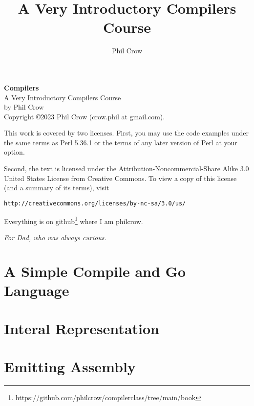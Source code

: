 \documentclass{book}
\begin{document}
\frontmatter
\pagestyle{empty}
\title{A Very Introductory Compilers Course}
\author{Phil Crow}
\date{}
\maketitle

\noindent
\textbf{Compilers} \\
A Very Introductory Compilers Course \\
by Phil Crow \\

\vspace{.2in}
\noindent
Copyright \copyright 2023 Phil Crow (crow.phil at gmail.com).

\noindent
This work is covered by two licenses.  First, you may use the code examples
under the same terms as Perl 5.36.1 or the terms of any later version
of Perl at your option.

Second, the text is licensed under the
Attribution-Noncommercial-Share Alike 3.0 United States License
from Creative Commons.
To view a copy of this license (and a summary of its terms), visit

\begin{verbatim}
http://creativecommons.org/licenses/by-nc-sa/3.0/us/
\end{verbatim}

Everything is on github\footnote{https://github.com/philcrow/compilerclass/tree/main/book} where I am philcrow.

\newpage
\pagestyle{headings}

\begin{center}
\textit{For Dad, who was always curious.}
\end{center}

\tableofcontents



\mainmatter
{}

\part{A Simple Compile and Go Language}










\part{Interal Representation}


%
%

\part{Emitting Assembly}


%
%
%

\appendix


\backmatter
{}
\printindex
\end{document}
